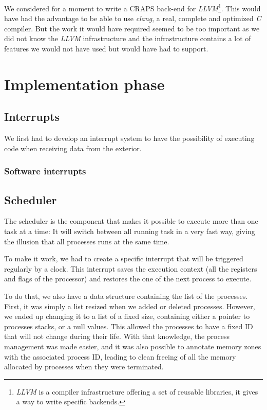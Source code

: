 \documentclass[openany, a4paper]{book}
\begin{document}
        We considered for a moment to write a CRAPS back-end for
        \emph{LLVM}\footnote{\emph{LLVM} is a compiler infrastructure
        offering a set of reusable libraries, it gives a way to write specific
        backends.\cite{llvm}}. This would have had the advantage to be able to
        use \emph{clang}, a real, complete and optimized \emph{C} compiler. But
        the work it would have required seemed to be too important as we did
        not know the \emph{LLVM} infrastructure and the infrastructure contains
        a lot of features we would not have used but would have had to
        support.

  \chapter{Implementation phase}
    \section{Interrupts}
      We first had to develop an interrupt system to have the possibility of
      executing code when receiving data from the exterior.

      \subsection{Software interrupts}

    \section{Scheduler}
      The scheduler is the component that makes it possible to execute more than
      one task at a time: It will switch between all running task in a very fast
      way, giving the illusion that all processes runs at the same time.

      To make it work, we had to create a specific interrupt that will be
      triggered regularly by a clock. This interrupt saves the execution
      context (all the registers and flags of the processor) and restores the
      one of the next process to execute.

      To do that, we also have a data structure containing the list of the
      processes. First, it was simply a list resized when we added or deleted
      processes. However, we ended up changing it to a list of a fixed size,
      containing either a pointer to processes stacks, or a null values.
      This allowed the processes to have a fixed ID that will not change during
      their life. With that knowledge, the process management was made
      easier, and it was also possible to annotate memory zones with the
      associated process ID, leading to clean freeing of all the memory
      allocated by processes when they were terminated.
\end{document}
